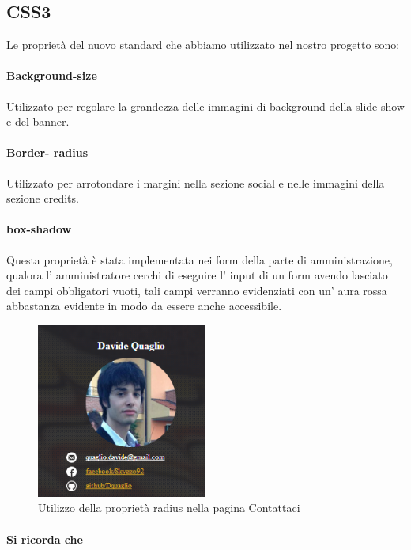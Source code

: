 \subsection{CSS3}

Le proprietà del nuovo standard che abbiamo utilizzato nel nostro progetto sono:

\paragraph{Background-size}

Utilizzato per regolare la grandezza delle immagini di background  della slide show e del banner.

\paragraph{Border- radius}

Utilizzato per arrotondare i margini nella sezione social e nelle immagini della sezione credits.

\paragraph{box-shadow}
Questa proprietà è stata implementata nei form della parte di amministrazione, qualora l' amministratore cerchi di eseguire l' input di un form avendo lasciato dei campi obbligatori vuoti, tali campi verranno evidenziati con un' aura rossa abbastanza evidente in modo da essere anche accessibile.
\begin{figure}[H]
		\centering \includegraphics[width=0.5\textwidth]{images/radius.png}
		\caption{Utilizzo della proprietà radius nella pagina Contattaci}
\end{figure}

\paragraph{Si ricorda che}

